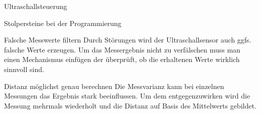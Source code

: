 \documentclass[12pt]{report}
\begin{document}
\begin{section}{Ultraschallsteuerung}
\begin{subsection}{Stolpersteine bei der Programmierung}
        \begin{paragraphwithnewline}{Falsche Messwerte filtern}
            Durch Störungen wird der Ultraschallsensor auch ggfs. falsche Werte
            erzeugen. Um das Messergebnis nicht zu verfälschen muss man einen
            Mechanismus einfügen der überprüft, ob die erhaltenen Werte wirklich
            sinnvoll sind. 
        \end{paragraphwithnewline}

        \begin{paragraphwithnewline}{Distanz möglichst genau berechnen}
            Die Messvarianz kann bei einzelnen Messungen das Ergebnis stark
            beeinflussen. Um dem entgegenzuwirken wird die Messung mehrmals
            wiederholt und die Distanz auf Basis des Mittelwerts gebildet.
        \end{paragraphwithnewline}



\end{subsection}
\end{section}
\end{document}
